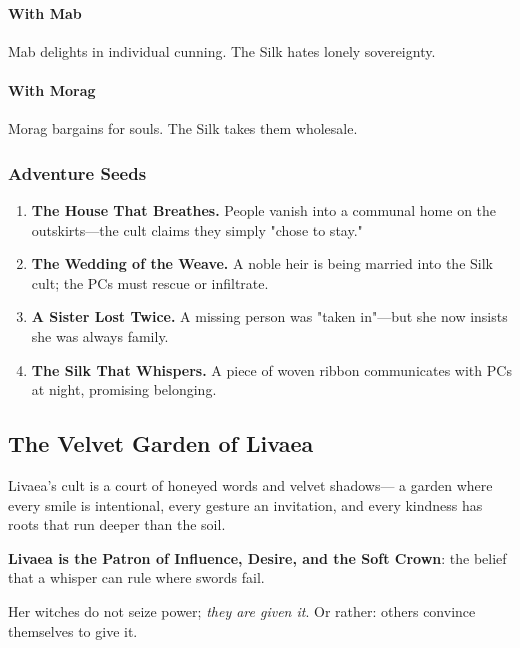 \documentclass[11pt]{book}
\begin{document}
\paragraph{With Mab}
Mab delights in individual cunning.  
The Silk hates lonely sovereignty.

\paragraph{With Morag}
Morag bargains for souls.  
The Silk takes them wholesale.

\subsubsection{Adventure Seeds}

\begin{enumerate}[leftmargin=*]
    \item \textbf{The House That Breathes.}  
    People vanish into a communal home on the outskirts---the cult claims they simply "chose to stay."

    \item \textbf{The Wedding of the Weave.}  
    A noble heir is being married into the Silk cult; the PCs must rescue or infiltrate.

    \item \textbf{A Sister Lost Twice.}  
    A missing person was "taken in"---but she now insists she was always family.

    \item \textbf{The Silk That Whispers.}  
    A piece of woven ribbon communicates with PCs at night, promising belonging.
\end{enumerate}

\subsection{The Velvet Garden of Livaea}

Livaea's cult is a court of honeyed words and velvet shadows---  
a garden where every smile is intentional, every gesture an invitation,  
and every kindness has roots that run deeper than the soil.

\textbf{Livaea is the Patron of Influence, Desire, and the Soft Crown}:  
the belief that a whisper can rule where swords fail.

Her witches do not seize power; \emph{they are given it}.  
Or rather: others convince themselves to give it.
\end{document}
